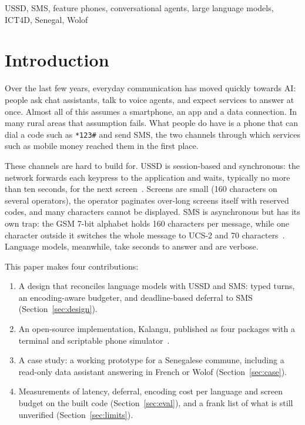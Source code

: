 \documentclass[conference]{IEEEtran}
\begin{document}
\begin{IEEEkeywords}
USSD, SMS, feature phones, conversational agents, large language models, ICT4D, Senegal, Wolof
\end{IEEEkeywords}

\section{Introduction}

Over the last few years, everyday communication has moved quickly towards AI:
people ask chat assistants, talk to voice agents, and expect services to
answer at once. Almost all of this assumes a smartphone, an app and a data
connection. In many rural areas that assumption fails. What people do have
is a phone that can dial a code such as \texttt{*123\#} and send SMS, the two
channels through which services such as mobile money reached them in the
first place.

These channels are hard to build for. USSD is session-based and synchronous:
the network forwards each keypress to the application and waits, typically no
more than ten seconds, for the next screen~\cite{atdocs,athelp}. Screens are
small (160 characters on several operators), the operator paginates
over-long screens itself with reserved codes, and many characters cannot be
displayed. SMS is asynchronous but has its own trap: the GSM 7-bit alphabet
holds 160 characters per message, while one character outside it switches the
whole message to UCS-2 and 70 characters~\cite{3gpp23038}. Language models,
meanwhile, take seconds to answer and are verbose.

This paper makes four contributions:
\begin{enumerate}
  \item A design that reconciles language models with USSD and SMS: typed
  turns, an encoding-aware budgeter, and deadline-based deferral to SMS
  (Section~\ref{sec:design}).
  \item An open-source implementation, Kalangu, published as four packages
  with a terminal and scriptable phone simulator~\cite{kalanguRepo}.
  \item A case study: a working prototype for a Senegalese commune, including
  a read-only data assistant answering in French or Wolof
  (Section~\ref{sec:case}).
  \item Measurements of latency, deferral, encoding cost per language and
  screen budget on the built code (Section~\ref{sec:eval}), and a frank list
  of what is still unverified (Section~\ref{sec:limits}).
\end{enumerate}
\end{document}
